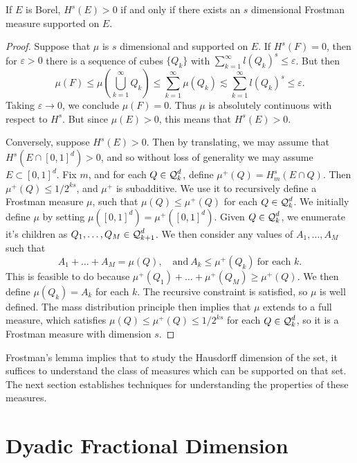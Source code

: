 \begin{lemma}
	If $E$ is Borel, $H^s(E) > 0$ if and only if there exists an $s$ dimensional Frostman measure supported on $E$.
\end{lemma}
\begin{proof}
	Suppose that $\mu$ is $s$ dimensional and supported on $E$. If $H^s(F) = 0$, then for $\varepsilon > 0$ there is a sequence of cubes $\{ Q_k \}$ with $\sum_{k = 1}^\infty l(Q_k)^s \leq \varepsilon$. But then
	\[ \mu(F) \leq \mu \left( \bigcup_{k = 1}^\infty Q_k \right) \leq \sum_{k = 1}^\infty \mu(Q_k) \lesssim \sum_{k = 1}^\infty l(Q_k)^s \leq \varepsilon. \]
	Taking $\varepsilon \to 0$, we conclude $\mu(F) = 0$. Thus $\mu$ is absolutely continuous with respect to $H^s$. But since $\mu(E) > 0$, this means that $H^s(E) > 0$.

	Conversely, suppose $H^s(E) > 0$. Then by translating, we may assume that $H^s(E \cap [0,1]^d) > 0$, and so without loss of generality we may assume $E \subset [0,1]^d$. Fix $m$, and for each $Q \in \operatorname{\mathcal{Q}}_k^d$, define $\mu^+(Q) = H^s_m(E \cap Q)$. Then $\mu^+(Q) \leq 1/2^{ks}$, and $\mu^+$ is subadditive. We use it to recursively define a Frostman measure $\mu$, such that $\mu(Q) \leq \mu^+(Q)$ for each $Q \in \operatorname{\mathcal{Q}}_k^d$. We initially define $\mu$ by setting $\mu([0,1]^d) = \mu^+([0,1]^d)$. Given $Q \in \operatorname{\mathcal{Q}}_k^d$, we enumerate it's children as $Q_1, \dots, Q_M \in \operatorname{\mathcal{Q}}_{k+1}^d$. We then consider any values of $A_1, \dots, A_M$ such that
	\[ A_1 + \dots + A_M = \mu(Q),\quad \text{and}\ A_k \leq \mu^+(Q_k)\ \text{for each $k$}. \]
	This is feasible to do because $\mu^+(Q_1) + \dots + \mu^+(Q_M) \geq \mu^+(Q)$. We then define $\mu(Q_k) = A_k$ for each $k$. The recursive constraint is satisfied, so $\mu$ is well defined. The mass distribution principle then implies that $\mu$ extends to a full measure, which satisfies $\mu(Q) \leq \mu^+(Q) \leq 1/2^{ks}$ for each $Q \in \operatorname{\mathcal{Q}}_k^d$, so it is a Frostman measure with dimension $s$.
\end{proof}

Frostman's lemma implies that to study the Hausdorff dimension of the set, it suffices to understand the class of measures which can be supported on that set. The next section establishes techniques for understanding the properties of these measures.




\section{Dyadic Fractional Dimension}

